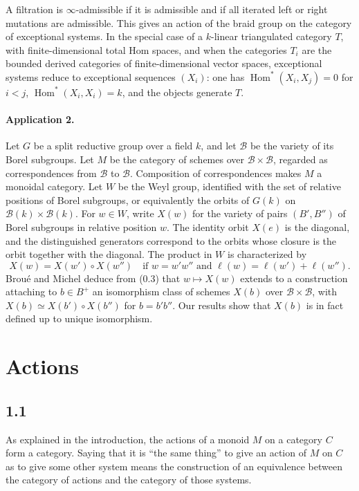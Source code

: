 \documentclass[11pt]{article}
\newcommand{\Hom}{\operatorname{Hom}}
\begin{document}
A filtration is $\infty$-admissible if it is admissible and if all iterated left or right mutations are admissible. This gives an action of the braid group on the category of exceptional systems. In the special case of a $k$-linear triangulated category $T$, with finite-dimensional total Hom spaces, and when the categories $T_i$ are the bounded derived categories of finite-dimensional vector spaces, exceptional systems reduce to exceptional sequences $(X_i)$: one has $\Hom^*(X_i,X_j)=0$ for $i<j$, $\Hom^*(X_i,X_i)=k$, and the objects generate $T$.

\paragraph{Application 2.} Let $G$ be a split reductive group over a field $k$, and let $\mathcal B$ be the variety of its Borel subgroups. Let $M$ be the category of schemes over $\mathcal B\times\mathcal B$, regarded as correspondences from $\mathcal B$ to $\mathcal B$. Composition of correspondences makes $M$ a monoidal category. Let $W$ be the Weyl group, identified with the set of relative positions of Borel subgroups, or equivalently the orbits of $G(k)$ on $\mathcal B(k)\times\mathcal B(k)$. For $w\in W$, write $X(w)$ for the variety of pairs $(B',B'')$ of Borel subgroups in relative position $w$. The identity orbit $X(e)$ is the diagonal, and the distinguished generators correspond to the orbits whose closure is the orbit together with the diagonal. The product in $W$ is characterized by
\begin{equation}
X(w)=X(w')\circ X(w'')
\quad\text{if } w=w'w'' \text{ and } \ell(w)=\ell(w')+\ell(w'').\tag{0.3}
\end{equation}
Broué and Michel deduce from (0.3) that $w\mapsto X(w)$ extends to a construction attaching to $b\in B^+$ an isomorphism class of schemes $X(b)$ over $\mathcal B\times\mathcal B$, with $X(b)\simeq X(b')\circ X(b'')$ for $b=b'b''$. Our results show that $X(b)$ is in fact defined up to unique isomorphism.

\section{Actions}

\subsection*{1.1}
As explained in the introduction, the actions of a monoid $M$ on a category $C$ form a category. Saying that it is ``the same thing'' to give an action of $M$ on $C$ as to give some other system means the construction of an equivalence between the category of actions and the category of those systems.
\end{document}
